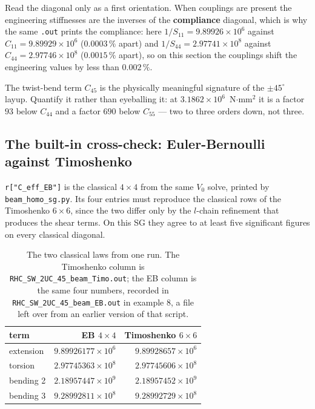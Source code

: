 Read the diagonal only as a first orientation. When couplings are present the
engineering stiffnesses are the inverses of the \textbf{compliance} diagonal,
which is why the same \texttt{.out} prints the compliance: here
$1/S_{11} = 9.89926\times10^{6}$ against $C_{11} = 9.89929\times10^{6}$
($0.0003\,\%$ apart) and $1/S_{44} = 2.97741\times10^{8}$ against
$C_{44} = 2.97746\times10^{8}$ ($0.0015\,\%$ apart), so on this section the
couplings shift the engineering values by less than $0.002\,\%$.

The twist-bend term $C_{45}$ is the physically meaningful signature of the
$\pm45^\circ$ layup. Quantify it rather than eyeballing it: at
$3.1862\times10^{6}$~N$\cdot$mm$^2$ it is a factor $93$ below $C_{44}$ and a
factor $690$ below $C_{55}$ --- two to three orders down, not three.

\subsection{The built-in cross-check: Euler-Bernoulli against Timoshenko}

\texttt{r["C\_eff\_EB"]} is the classical $4\times4$ from the same $V_0$ solve,
printed by \texttt{beam\_homo\_sg.py}. Its four entries must reproduce the
classical rows of the Timoshenko $6\times6$, since the two differ only by the
$l$-chain refinement that produces the shear terms. On this SG they agree to at
least five significant figures on every classical diagonal.

\begin{table}[htbp]
\centering
\small
\begin{tabular}{lrr}
\toprule
term & EB $4\times4$ & Timoshenko $6\times6$ \\
\midrule
extension & $9.89926177\times10^{6}$ & $9.89928657\times10^{6}$ \\
torsion & $2.97745363\times10^{8}$ & $2.97745606\times10^{8}$ \\
bending 2 & $2.18957447\times10^{9}$ & $2.18957452\times10^{9}$ \\
bending 3 & $9.28992811\times10^{8}$ & $9.28992729\times10^{8}$ \\
\bottomrule
\end{tabular}
\caption{The two classical laws from one run. The Timoshenko column is
\texttt{RHC\_SW\_2UC\_45\_beam\_Timo.out}; the EB column is the same four
numbers, recorded in \texttt{RHC\_SW\_2UC\_45\_beam\_EB.out} in example 8, a
file left over from an earlier version of that script.}
\label{tab:solid-ebvstimo}
\end{table}

